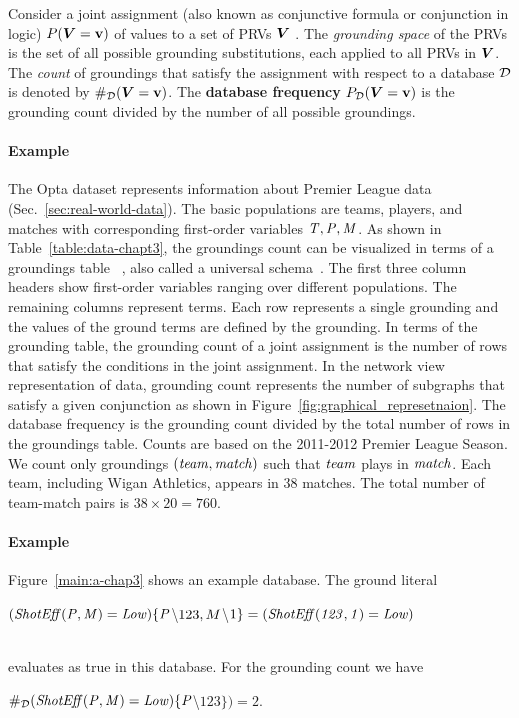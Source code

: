  	 	Consider a joint assignment (also known as conjunctive formula or conjunction in logic)
 	 	$P(\boldsymbol{V} = \mathbf{v})$ of values to a set of PRVs $\boldsymbol{V}$ . The {\em grounding space} of the PRVs is the set of all possible grounding substitutions, each applied to all PRVs in $\boldsymbol{V}$. The {\em count} of groundings that satisfy the assignment with respect to a database $\mathcal{D}$ is denoted by $\#_{\mathcal{D}}(\boldsymbol{V} = \mathbf{v})$. The \textbf{database frequency} $P_{\mathcal{D}}(\boldsymbol{V} = \mathbf{v})$ is the grounding count divided by the number of all possible groundings. 
 	 	
 	 	\paragraph{Example} \label{sec:example}
 	 	The Opta dataset represents information about Premier League data %
 	 	(Sec.~\ref{sec:real-world-data}). 
 	 	The basic populations are teams, players, and matches with 
 	 	corresponding first-order variables $\it{T}, \it{P}, \it{M}$. As shown in Table~\ref{table:data-chapt3}, the groundings count can be visualized in terms of a groundings table ~\cite{Schulte2012}, also called a universal schema~\cite{Riedel2013}. 
 	 	The first three column headers show first-order variables ranging over different populations. The remaining columns represent terms. Each row represents a single grounding and the values of the ground terms are defined by the grounding.
 	 	In terms of the grounding table, the grounding count of a joint assignment is the number of rows that satisfy the conditions in the joint assignment. In the network view representation of data, grounding count represents the number of subgraphs that satisfy a given conjunction as shown in Figure~\ref{fig:graphical_represetnaion}.  The database frequency is the grounding count divided by the total number of rows in the groundings table. Counts are based on the 2011-2012 Premier League Season. We count only groundings $(\it{team},\it{match})$ such that $\it{team}$ plays in $\it{match}$. Each team, including Wigan Athletics, appears in 38 matches. The total number of team-match pairs is $38 \times 20 = 760$.
 	 	\paragraph{Example} Figure~\ref{main:a-chap3} shows an example database. The ground literal\\ \centerline{$(\it{ShotEff(P,M)} = Low) \{P$\textbackslash$ 123,M$\textbackslash$ 1\}=(\it{ShotEff}(123,1)=Low)$}\\ evaluates as true in this database. For the grounding count we have\\ \centerline{$\#_{\mathcal{D}}(\it{ShotEff(P,M)} = Low) \{P$\textbackslash$ 123\}) = 2.$}
 	 	
